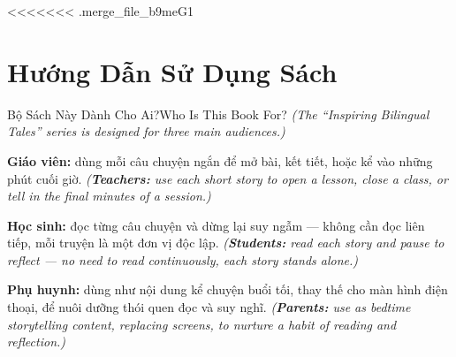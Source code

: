 <<<<<<< .merge_file_b9meG1
\chapter*{Hướng Dẫn Sử Dụng Sách}

\begin{truyen}{Bộ Sách Này Dành Cho Ai?}{Who Is This Book For?}
\textit{(The ``Inspiring Bilingual Tales'' series is designed for three main audiences.)}

\textbf{Giáo viên:} dùng mỗi câu chuyện ngắn để mở bài, kết tiết, hoặc kể vào những phút cuối giờ.
\textit{(\textbf{Teachers:} use each short story to open a lesson, close a class, or tell in the final minutes of a session.)}

\textbf{Học sinh:} đọc từng câu chuyện và dừng lại suy ngẫm --- không cần đọc liên tiếp, mỗi truyện là một đơn vị độc lập.
\textit{(\textbf{Students:} read each story and pause to reflect --- no need to read continuously, each story stands alone.)}

\textbf{Phụ huynh:} dùng như nội dung kể chuyện buổi tối, thay thế cho màn hình điện thoại, để nuôi dưỡng thói quen đọc và suy nghĩ.
\textit{(\textbf{Parents:} use as bedtime storytelling content, replacing screens, to nurture a habit of reading and reflection.)}
\end{truyen}

\vspace{6pt}

